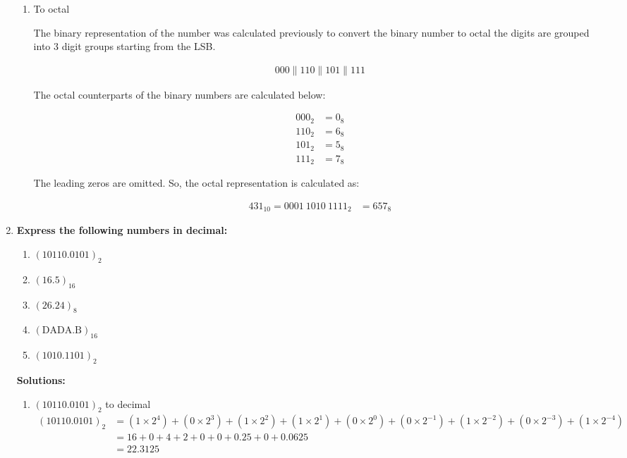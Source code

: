 \documentclass{article}
\begin{document}
\begin{enumerate}[label=\textbf{\arabic*.}]
\begin{enumerate}[label=\textbf{\alph*.}]
        

        \item To octal \newline
        
        The binary representation of the number was calculated previously to convert the binary number to octal the digits are grouped into 3 digit groups starting from the LSB.

        \begin{align*}
            000 \parallel 110 \parallel 101 \parallel 111  
        \end{align*}
    
        The octal counterparts of the binary numbers are calculated below: \newline

        \begin{align*}
            000_2 &= 0_8 \\
            110_2 &= 6_8 \\
            101_2 &= 5_8 \\
            111_2 &= 7_8
        \end{align*}

        The leading zeros are omitted. So, the octal representation is calculated as: \newline

        \begin{align*}
            431_{10} = 0001 \ 1010 \ 1111_2 &= 657_8
        \end{align*}
    \end{enumerate}
    \newpage
    

    \item \textbf{Express the following numbers in decimal:} \\
    
    \begin{enumerate}
        \item \((10110.0101)_2\)
        \item \((16.5)_{16}\)
        \item \((26.24)_8\)
        \item \((\text{DADA.B})_{16}\)
        \item \((1010.1101)_2\)
    \end{enumerate}

    \textbf{Solutions:} \newline

    \begin{enumerate}[label=\textbf{\alph*.}]
        \item \((10110.0101)_2\) to decimal \newline
        \begin{align*}
            (10110.0101)_2 &= (1 \times 2^4) + (0 \times 2^3) + (1 \times 2^2) + (1 \times 2^1) + (0 \times 2^0) + (0 \times 2^{-1}) + (1 \times 2^{-2}) + (0 \times 2^{-3}) + (1 \times 2^{-4}) \\
           &= 16 + 0 + 4 + 2 + 0 + 0 + 0.25 + 0 + 0.0625 \\
           &= 22.3125
        \end{align*}


\end{enumerate}
\end{enumerate}
\end{document}
